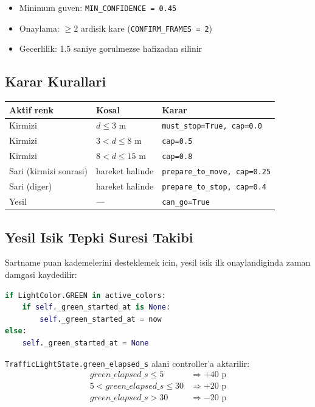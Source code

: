 \documentclass[a4paper,12pt]{article}
\begin{document}
\begin{itemize}
  \item Minimum guven: \texttt{MIN\_CONFIDENCE = 0.45}
  \item Onaylama: $\geq 2$ ardisik kare (\texttt{CONFIRM\_FRAMES = 2})
  \item Gecerlilik: 1.5 saniye gorulmezse hafizadan silinir
\end{itemize}

\subsection{Karar Kurallari}

\begin{center}
\begin{tabular}{lll}
  \toprule
  Aktif renk               & Kosal         & Karar\\
  \midrule
  Kirmizi                  & $d \leq 3$ m  & \texttt{must\_stop=True, cap=0.0}\\
  Kirmizi                  & $3 < d \leq 8$ m & \texttt{cap=0.5}\\
  Kirmizi                  & $8 < d \leq 15$ m & \texttt{cap=0.8}\\
  Sari (kirmizi sonrasi)   & hareket halinde   & \texttt{prepare\_to\_move, cap=0.25}\\
  Sari (diger)             & hareket halinde   & \texttt{prepare\_to\_stop, cap=0.4}\\
  Yesil                    & ---               & \texttt{can\_go=True}\\
  \bottomrule
\end{tabular}
\end{center}

\subsection{Yesil Isik Tepki Suresi Takibi}

Sartname puan kademelerini desteklemek icin, yesil isik ilk onaylandiginda
zaman damgasi kaydedilir:

\begin{lstlisting}[language=Python, caption=Green timer (update metodu)]
if LightColor.GREEN in active_colors:
    if self._green_started_at is None:
        self._green_started_at = now
else:
    self._green_started_at = None
\end{lstlisting}

\texttt{TrafficLightState.green\_elapsed\_s} alani controller'a aktarilir:
\begin{align*}
  green\_elapsed\_s \leq 5 &\Rightarrow +40 \text{ p}\\
  5 < green\_elapsed\_s \leq 30 &\Rightarrow +20 \text{ p}\\
  green\_elapsed\_s > 30 &\Rightarrow -20 \text{ p}
\end{align*}
\end{document}
